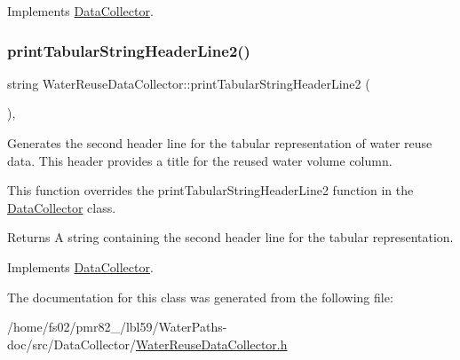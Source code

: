 Implements \mbox{\hyperlink{classDataCollector_a91619cfa9e9b8cefd2f7c20d5718b41e}{Data\+Collector}}.

\mbox{\label{classWaterReuseDataCollector_a8cead3771efabeb62dcf069008810f43}} 
\subsubsection{\texorpdfstring{print\+Tabular\+String\+Header\+Line2()}{printTabularStringHeaderLine2()}}
{\footnotesize\ttfamily string Water\+Reuse\+Data\+Collector\+::print\+Tabular\+String\+Header\+Line2 (\begin{DoxyParamCaption}{ }\end{DoxyParamCaption})\hspace{0.3cm}{\ttfamily [override]}, {\ttfamily [virtual]}}



Generates the second header line for the tabular representation of water reuse data. This header provides a title for the reused water volume column. 

This function overrides the {\ttfamily print\+Tabular\+String\+Header\+Line2} function in the {\ttfamily \mbox{\hyperlink{classDataCollector}{Data\+Collector}}} class.

\begin{DoxyReturn}{Returns}
A string containing the second header line for the tabular representation. 
\end{DoxyReturn}


Implements \mbox{\hyperlink{classDataCollector_af01ea961314be2164f39e6d4cd59e443}{Data\+Collector}}.



The documentation for this class was generated from the following file\+:\begin{DoxyCompactItemize}
\item 
/home/fs02/pmr82\+\_/lbl59/\+Water\+Paths-\/doc/src/\+Data\+Collector/\mbox{\hyperlink{WaterReuseDataCollector_8h}{Water\+Reuse\+Data\+Collector.\+h}}\end{DoxyCompactItemize}
